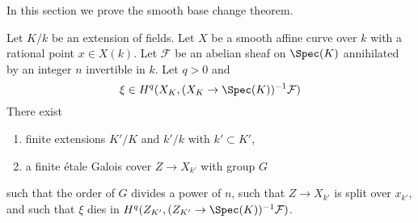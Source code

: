\noindent
In this section we prove the smooth base change theorem.

\begin{lemma}
\label{lemma-smooth-base-change-fields}
Let $K/k$ be an extension of fields. Let $X$ be a smooth affine curve
over $k$ with a rational point $x \in X(k)$. Let $\mathcal{F}$ be an abelian
sheaf on $\Spec(K)$ annihilated by an integer $n$ invertible in $k$.
Let $q > 0$ and
$$
\xi \in H^q(X_K, (X_K \to \Spec(K))^{-1}\mathcal{F})
$$
There exist
\begin{enumerate}
\item finite extensions $K'/K$ and $k'/k$ with $k' \subset K'$,
\item a finite \'etale Galois cover $Z \to X_{k'}$ with group $G$
\end{enumerate}
such that the order of $G$ divides a power of $n$, such that
$Z \to X_{k'}$ is split over $x_{k'}$, and
such that $\xi$ dies in $H^q(Z_{K'}, (Z_{K'} \to \Spec(K))^{-1}\mathcal{F})$.
\end{lemma}


